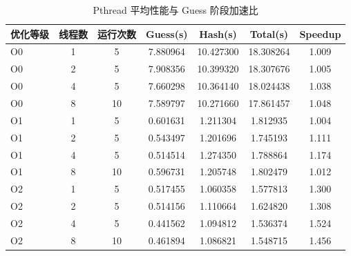 \documentclass[UTF8,a4paper,12pt]{ctexart}
\begin{document}
\begin{table}[htbp]
  \centering
  \caption{Pthread 平均性能与 Guess 阶段加速比}
  \label{tab:pthread}
  \small
  \begin{tabular}{lcccccc}
    \toprule
    优化等级 & 线程数 & 运行次数 & Guess(s) & Hash(s) & Total(s) & Speedup \\
    \midrule
    O0 & 1 & 5 & 7.880964 & 10.427300 & 18.308264 & 1.009 \\
    O0 & 2 & 5 & 7.908356 & 10.399320 & 18.307676 & 1.005 \\
    O0 & 4 & 5 & 7.660298 & 10.364140 & 18.024438 & 1.038 \\
    O0 & 8 & 10 & 7.589797 & 10.271660 & 17.861457 & 1.048 \\
    O1 & 1 & 5 & 0.601631 & 1.211304 & 1.812935 & 1.004 \\
    O1 & 2 & 5 & 0.543497 & 1.201696 & 1.745193 & 1.111 \\
    O1 & 4 & 5 & 0.514514 & 1.274350 & 1.788864 & 1.174 \\
    O1 & 8 & 10 & 0.596731 & 1.205748 & 1.802479 & 1.012 \\
    O2 & 1 & 5 & 0.517455 & 1.060358 & 1.577813 & 1.300 \\
    O2 & 2 & 5 & 0.514156 & 1.110664 & 1.624820 & 1.308 \\
    O2 & 4 & 5 & 0.441562 & 1.094812 & 1.536374 & 1.524 \\
    O2 & 8 & 10 & 0.461894 & 1.086821 & 1.548715 & 1.456 \\
    \bottomrule
  \end{tabular}
\end{table}
\end{document}
